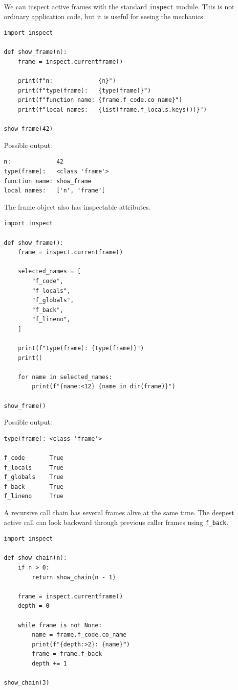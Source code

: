 We can inspect active frames with the standard \texttt{inspect} module. This is not ordinary application code, but it is useful for seeing the mechanics.

\begin{verbatim}
import inspect

def show_frame(n):
    frame = inspect.currentframe()

    print(f"n:             {n}")
    print(f"type(frame):   {type(frame)}")
    print(f"function name: {frame.f_code.co_name}")
    print(f"local names:   {list(frame.f_locals.keys())}")

show_frame(42)
\end{verbatim}

Possible output:

\begin{verbatim}
n:             42
type(frame):   <class 'frame'>
function name: show_frame
local names:   ['n', 'frame']
\end{verbatim}

The frame object also has inspectable attributes.

\begin{verbatim}
import inspect

def show_frame():
    frame = inspect.currentframe()

    selected_names = [
        "f_code",
        "f_locals",
        "f_globals",
        "f_back",
        "f_lineno",
    ]

    print(f"type(frame): {type(frame)}")
    print()

    for name in selected_names:
        print(f"{name:<12} {name in dir(frame)}")

show_frame()
\end{verbatim}

Possible output:

\begin{verbatim}
type(frame): <class 'frame'>

f_code       True
f_locals     True
f_globals    True
f_back       True
f_lineno     True
\end{verbatim}

A recursive call chain has several frames alive at the same time. The deepest active call can look backward through previous caller frames using \texttt{f\_back}.

\begin{verbatim}
import inspect

def show_chain(n):
    if n > 0:
        return show_chain(n - 1)

    frame = inspect.currentframe()
    depth = 0

    while frame is not None:
        name = frame.f_code.co_name
        print(f"{depth:>2}: {name}")
        frame = frame.f_back
        depth += 1

show_chain(3)
\end{verbatim}

